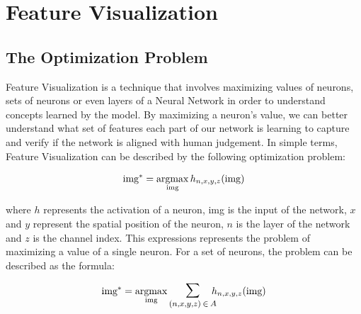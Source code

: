 
% 

\chapter{Feature Visualization}

\section{The Optimization Problem}

Feature Visualization \citep{FeatVisFirstArticle} is a technique that involves maximizing values of neurons, sets of neurons or even layers \citep{DeepDreamArticle} of a Neural Network in order to understand concepts learned by the model.
By maximizing a neuron's value, we can better understand what set of features each part of our network is learning to capture and verify if the network is aligned with human judgement.
In simple terms, Feature Visualization can be described by the following optimization problem:

\begin{equation}
    \text{img}^* = \operatorname*{argmax}_{\text{img}} h_{n, x, y, z} (\text{img})
    \label{eq:feat_vis_optimization}
\end{equation}

\noindent where \(h\) represents the activation of a neuron, img is the input of the network, \(x\) and \(y\) represent the spatial position of the neuron, \(n\) is the layer of the network and \(z\) is the channel index.
This expressions represents the problem of maximizing a value of a single neuron. For a set of neurons, the problem can be described as the formula:

\begin{equation}
    \text{img}^* =  \argmax_{\text{img}} \mathlarger{\mathlarger{\sum}}_{(n, x, y, z) \: \in \: A} \!\!\! h_{n, x, y, z} (\text{img})
    \label{eq:feat_vis_optimization_multivar}
\end{equation}

